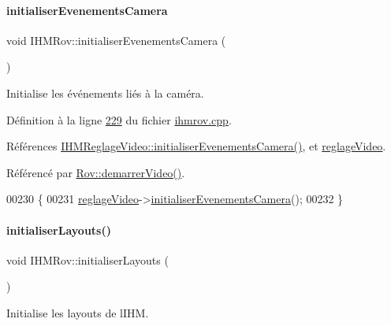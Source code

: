 \paragraph{\texorpdfstring{initialiser\+Evenements\+Camera}{initialiserEvenementsCamera}}
{\footnotesize\ttfamily void I\+H\+M\+Rov\+::initialiser\+Evenements\+Camera (\begin{DoxyParamCaption}{ }\end{DoxyParamCaption})\hspace{0.3cm}{\ttfamily [slot]}}



Initialise les événements liés à la caméra. 



Définition à la ligne \hyperlink{ihmrov_8cpp_source_l00229}{229} du fichier \hyperlink{ihmrov_8cpp_source}{ihmrov.\+cpp}.



Références \hyperlink{ihmreglagevideo_8cpp_source_l00117}{I\+H\+M\+Reglage\+Video\+::initialiser\+Evenements\+Camera()}, et \hyperlink{ihmrov_8h_source_l00048}{reglage\+Video}.



Référencé par \hyperlink{rov_8cpp_source_l00161}{Rov\+::demarrer\+Video()}.


\begin{DoxyCode}
00230 \{
00231     \hyperlink{class_i_h_m_rov_a6baa53853d29151404e6ae3dec5d2003}{reglageVideo}->\hyperlink{class_i_h_m_reglage_video_aba318ba2789177dafcf2651f95603435}{initialiserEvenementsCamera}();
00232 \}
\end{DoxyCode}
\mbox{\label{class_i_h_m_rov_aa900473297415bf43a13c4152034135a}} 
\paragraph{\texorpdfstring{initialiser\+Layouts()}{initialiserLayouts()}}
{\footnotesize\ttfamily void I\+H\+M\+Rov\+::initialiser\+Layouts (\begin{DoxyParamCaption}{ }\end{DoxyParamCaption})\hspace{0.3cm}{\ttfamily [private]}}



Initialise les layouts de l\textquotesingle{}I\+HM. 



